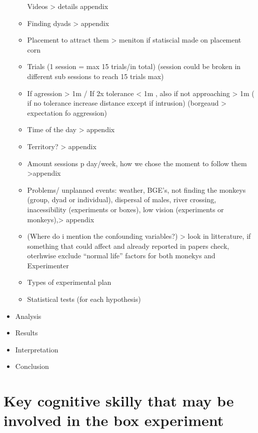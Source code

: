 \documentclass[
]{article}
\begin{document}
\begin{itemize}
\begin{itemize}
    Videos \textgreater{} details appendix
  \item
    Finding dyads \textgreater{} appendix
  \item
    Placement to attract them \textgreater{} meniton if statiscial made
    on placement corn
  \item
    Trials (1 session = max 15 trials/in total) (session could be broken
    in different sub sessions to reach 15 trials max)
  \item
    If agression \textgreater{} 1m / If 2x tolerance \textless{} 1m ,
    also if not approaching \textgreater{} 1m ( if no tolerance increase
    distance except if intrusion) (borgeaud \textgreater{} expectation
    fo aggression)
  \item
    Time of the day \textgreater{} appendix
  \item
    Territory? \textgreater{} appendix
  \item
    Amount sessions p day/week, how we chose the moment to follow them
    \textgreater appendix
  \item
    Problems/ unplanned events: weather, BGE's, not finding the monkeys
    (group, dyad or individual), dispersal of males, river crossing,
    inacessibility (experiments or boxes), low vision (experiments or
    monkeys),\textgreater{} appendix
  \item
    (Where do i mention the confounding variables?) \textgreater{} look
    in litterature, if something that could affect and already reported
    in papers check, oterhwise exclude ``normal life'' factors for both
    monekys and Experimenter
  \item
    Types of experimental plan
  \item
    Statistical tests (for each hypothesis)
  \end{itemize}
\item
  Analysis
\item
  Results
\item
  Interpretation
\item
  Conclusion
\end{itemize}

\hypertarget{key-cognitive-skilly-that-may-be-involved-in-the-box-experiment}{%
\section{Key cognitive skilly that may be involved in the box
experiment}\label{key-cognitive-skilly-that-may-be-involved-in-the-box-experiment}}
\end{document}
